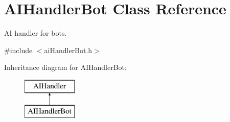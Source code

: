 \hypertarget{classAIHandlerBot}{
\section{\-A\-I\-Handler\-Bot \-Class \-Reference}
\label{d9/d8c/classAIHandlerBot}
}


\-A\-I handler for bots.  




{\ttfamily \#include $<$ai\-Handler\-Bot.\-h$>$}

\-Inheritance diagram for \-A\-I\-Handler\-Bot\-:\begin{figure}[H]
\begin{center}
\leavevmode
\includegraphics[height=2.000000cm]{d9/d8c/classAIHandlerBot}
\end{center}
\end{figure}
